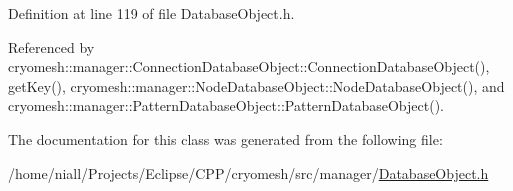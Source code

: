 \-Definition at line 119 of file \-Database\-Object.\-h.



\-Referenced by cryomesh\-::manager\-::\-Connection\-Database\-Object\-::\-Connection\-Database\-Object(), get\-Key(), cryomesh\-::manager\-::\-Node\-Database\-Object\-::\-Node\-Database\-Object(), and cryomesh\-::manager\-::\-Pattern\-Database\-Object\-::\-Pattern\-Database\-Object().



\-The documentation for this class was generated from the following file\-:\begin{DoxyCompactItemize}
\item 
/home/niall/\-Projects/\-Eclipse/\-C\-P\-P/cryomesh/src/manager/\hyperlink{DatabaseObject_8h}{\-Database\-Object.\-h}\end{DoxyCompactItemize}
